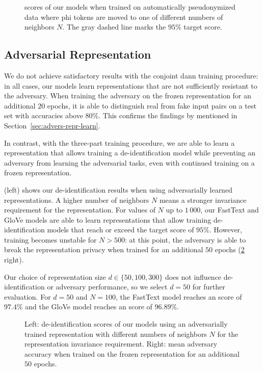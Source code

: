 \begin{figure}
    \centering
    
    \caption[De-identification with automatic pseudonymization]{%
        \fone scores of our models when trained on automatically pseudonymized data where \ac{phi} tokens are moved to one of different numbers of neighbors $N$.
        The gray dashed line marks the $95\%$ target \fone score.
}\label{fig:auto-pseudo}
\end{figure}

\subsection{Adversarial Representation}
%
We do not achieve satisfactory results with the conjoint \ac{dann} training procedure: in all cases, our models learn representations that are not sufficiently resistant to the adversary.
%
When training the adversary on the frozen representation for an additional $20$ epochs, it is able to distinguish real from fake input pairs on a test set with accuracies above $80\%$.
%
This confirms the findings by \citet{elazar2018adversarial} mentioned in Section~\ref{sec:advers-repr-learn}.

%
In contrast, with the three-part training procedure, we are able to learn a representation that allows training a de-identification model while preventing an adversary from learning the adversarial tasks, even with continued training on a frozen representation.

%
 (left) shows our de-identification results when using adversarially learned representations.
%
A higher number of neighbors $N$ means a stronger invariance requirement for the representation.
%
For values of $N$ up to $1\,000$, our FastText and GloVe models are able to learn representations that allow training de-identification models that reach or exceed the target \fone score of $95\%$.
%
However, training becomes unstable for $N>500$: at this point, the adversary is able to break the representation privacy when trained for an additional $50$ epochs (\cref{fig:adversarial-deid} right).

%
Our choice of representation size $d \in \{50, 100, 300\}$ does not influence de-identifi\-ca\-tion or adversary performance, so we select $d=50$ for further evaluation.
%
For $d=50$ and $N=100$, the FastText model reaches an \fone score of $97.4\%$ and the GloVe model reaches an \fone score of $96.89\%$.

\begin{figure}
    \centering
    
    \caption[De-identification with adversarially learned representations]{%
        Left: de-identification \fone scores of our models using an adversarially trained representation with different numbers of neighbors $N$ for the representation invariance requirement.
        Right: mean adversary accuracy when trained on the frozen representation for an additional $50$ epochs.
    }\label{fig:adversarial-deid}
\end{figure}

